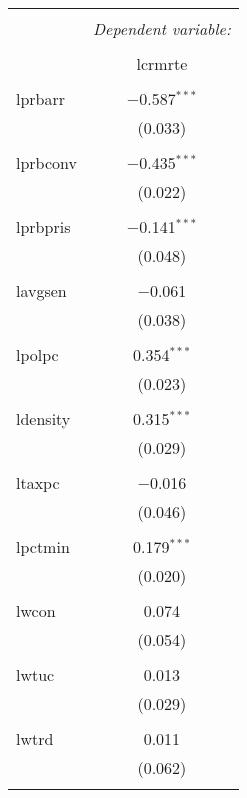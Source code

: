 
\begin{table}[!htbp] \centering 
  \caption{} 
  \label{} 
\begin{tabular}{@{\extracolsep{5pt}}lc} 
\\[-1.8ex]\hline 
\hline \\[-1.8ex] 
 & \multicolumn{1}{c}{\textit{Dependent variable:}} \\ 
\cline{2-2} 
\\[-1.8ex] & lcrmrte \\ 
\hline \\[-1.8ex] 
 lprbarr & $-$0.587$^{***}$ \\ 
  & (0.033) \\ 
  & \\ 
 lprbconv & $-$0.435$^{***}$ \\ 
  & (0.022) \\ 
  & \\ 
 lprbpris & $-$0.141$^{***}$ \\ 
  & (0.048) \\ 
  & \\ 
 lavgsen & $-$0.061 \\ 
  & (0.038) \\ 
  & \\ 
 lpolpc & 0.354$^{***}$ \\ 
  & (0.023) \\ 
  & \\ 
 ldensity & 0.315$^{***}$ \\ 
  & (0.029) \\ 
  & \\ 
 ltaxpc & $-$0.016 \\ 
  & (0.046) \\ 
  & \\ 
 lpctmin & 0.179$^{***}$ \\ 
  & (0.020) \\ 
  & \\ 
 lwcon & 0.074 \\ 
  & (0.054) \\ 
  & \\ 
 lwtuc & 0.013 \\ 
  & (0.029) \\ 
  & \\ 
 lwtrd & 0.011 \\ 
  & (0.062) \\ 
  & \\ 

\end{tabular}
\end{table}
